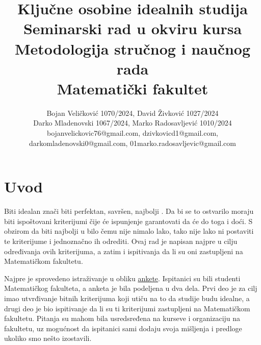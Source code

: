 \documentclass[a4paper]{article}
\begin{document}
\title{Ključne osobine idealnih studija\\ \small{Seminarski rad u okviru kursa\\Metodologija stručnog i naučnog rada\\ Matematički fakultet}}

\author{Bojan Veličković 1070/2024, David Živković 1027/2024\\ Darko Mladenovski 1067/2024, Marko Radosavljević 1010/2024\\bojanvelickovic76@gmail.com, dzivkovicd1@gmail.com,\\ darkomladenovski0@gmail.com, 01marko.radosavljevic@gmail.com}



\maketitle


\tableofcontents

\newpage

\section{Uvod}
\label{sec:uvod}

Biti idealan znači biti perfektan, savršen, najbolji \cite{ideal}. Da bi se to ostvarilo moraju biti ispoštovani kriterijumi čije će ispunjenje garantovati da će do toga i doći. S obzirom da biti najbolji u bilo čemu nije nimalo lako, tako nije lako ni postaviti te kriterijume i jednoznačno ih odrediti. Ovaj rad je napisan najpre u cilju određivanja ovih kriterijuma, a zatim i ispitivanja da li su oni zastupljeni na Matematičkom fakultetu.

Najpre je sprovedeno istraživanje u obliku \href{https://github.com/zdavid01/IdealneStudije/blob/main/IdealneStudije(Responses).xlsx}{ankete}. Ispitanici su bili studenti Matematičkog fakulteta, a anketa je bila podeljena u dva dela. Prvi deo je za cilj imao utvrđivanje bitnih kriterijuma koji utiču na to da studije budu idealne, a drugi deo je bio ispitivanje da li su ti kriterijumi zastupljeni na Matematičkom fakultetu. Pitanja su mahom bila usredsređena na kurseve i organizaciju na fakultetu, uz mogućnost da ispitanici sami dodaju svoja mišljenja i predloge ukoliko smo nešto izostavili. 
\end{document}
